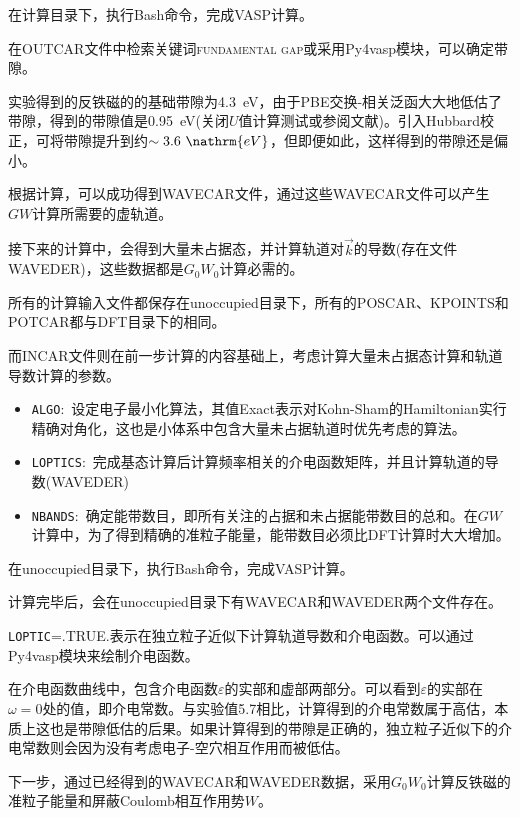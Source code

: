 在计算目录下，执行\textrm{Bash}命令，完成\textrm{VASP}计算。

在\textrm{OUTCAR}文件中检索关键词\textsc{fundamental gap}或采用\textrm{Py4vasp}模块，可以确定带隙。

实验得到的反铁磁的的基础带隙为\textrm{4.3~eV}，由于\textrm{PBE}交换-相关泛函大大地低估了带隙，得到的带隙值是\textrm{0.95~eV}(关闭$U$值计算测试或参阅文献\cite{JPCA121-3318_2017})。引入\textrm{Hubbard}校正，可将带隙提升到约$\sim3.6~\nathrm{eV}$，但即便如此，这样得到的带隙还是偏小。

根据计算，可以成功得到\textrm{WAVECAR}文件，通过这些\textrm{WAVECAR}文件可以产生$GW$计算所需要的虚轨道。

接下来的计算中，会得到大量未占据态，并计算轨道对$\vec k$的导数(存在文件\textrm{WAVEDER})，这些数据都是$G_0W_0$计算必需的。

所有的计算输入文件都保存在\textrm{unoccupied}目录下，所有的\textrm{POSCAR}、\textrm{KPOINTS}和\textrm{POTCAR}都与\textrm{DFT}目录下的相同。

而\textrm{INCAR}文件则在前一步计算的内容基础上，考虑计算大量未占据态计算和轨道导数计算的参数。
\begin{itemize}
	\item \texttt{ALGO}:~设定电子最小化算法，其值\textrm{Exact}表示对\textrm{Kohn-Sham}的\textrm{Hamiltonian}实行精确对角化，这也是小体系中包含大量未占据轨道时优先考虑的算法。
	\item \texttt{LOPTICS}:~完成基态计算后计算频率相关的介电函数矩阵，并且计算轨道的导数\textrm{(WAVEDER)}
	\item \texttt{NBANDS}:~确定能带数目，即所有关注的占据和未占据能带数目的总和。在$GW$计算中，为了得到精确的准粒子能量，能带数目必须比\textrm{DFT}计算时大大增加。
\end{itemize}
在\textrm{unoccupied}目录下，执行\textrm{Bash}命令，完成\textrm{VASP}计算。

计算完毕后，会在\textrm{unoccupied}目录下有\textrm{WAVECAR}和\textrm{WAVEDER}两个文件存在。

\texttt{LOPTIC}=\textrm{.TRUE.}表示在独立粒子近似下计算轨道导数和介电函数。可以通过\textrm{Py4vasp}模块来绘制介电函数。

在介电函数曲线中，包含介电函数$\varepsilon$的实部和虚部两部分。可以看到$\varepsilon$的实部在$\omega=0$处的值，即介电常数。与实验值5.7相比，计算得到的介电常数属于高估，本质上这也是带隙低估的后果。如果计算得到的带隙是正确的，独立粒子近似下的介电常数则会因为没有考虑电子-空穴相互作用而被低估。

下一步，通过已经得到的\textrm{WAVECAR}和\textrm{WAVEDER}数据，采用$G_0W_0$计算反铁磁的准粒子能量和屏蔽\textrm{Coulomb}相互作用势$W$。

